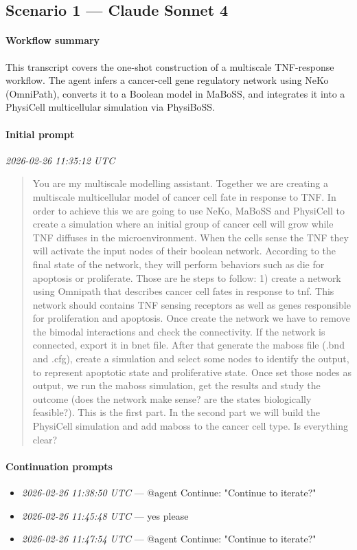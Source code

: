\subsection{Scenario 1 — Claude Sonnet 4}

\paragraph{Workflow summary}
This transcript covers the one-shot construction of a multiscale TNF-response workflow. The agent infers a cancer-cell gene regulatory network using NeKo (OmniPath), converts it to a Boolean model in MaBoSS, and integrates it into a PhysiCell multicellular simulation via PhysiBoSS.

\paragraph{Initial prompt} \hfill \textit{\small 2026-02-26 11:35:12 UTC}
\begin{quote}
You are my multiscale modelling assistant. Together we are creating a multiscale multicellular model of cancer cell fate in response to TNF. In order to achieve this we are going to use NeKo, MaBoSS and PhysiCell to create a simulation where an initial group of cancer cell will grow while TNF diffuses in the microenvironment. When the cells sense the TNF they will activate the input nodes of their boolean network. According to the final state of the network, they will perform behaviors such as die for apoptosis or proliferate. Those are he steps to follow: 1) create a network using Omnipath that describes cancer cell fates in response to tnf. This network should contains TNF sensing receptors as well as genes responsible for proliferation and apoptosis. Once create the network we have to remove the bimodal interactions and check the connectivity. If the network is connected, export it in bnet file. After that generate the maboss file (.bnd and .cfg), create a simulation and select some nodes to identify the output, to represent apoptotic state and proliferative state. Once set those nodes as output, we run the maboss simulation, get the results and study the outcome (does the network make
sense? are the states biologically feasible?). This is the first part. In the second part we will build the PhysiCell simulation and add maboss to the cancer cell type. Is everything clear?
\end{quote}

\paragraph{Continuation prompts}
\begin{itemize}
\item \textit{\small 2026-02-26 11:38:50 UTC} --- @agent Continue: "Continue to iterate?"
\item \textit{\small 2026-02-26 11:45:48 UTC} --- yes please
\item \textit{\small 2026-02-26 11:47:54 UTC} --- @agent Continue: "Continue to iterate?"
\end{itemize}

